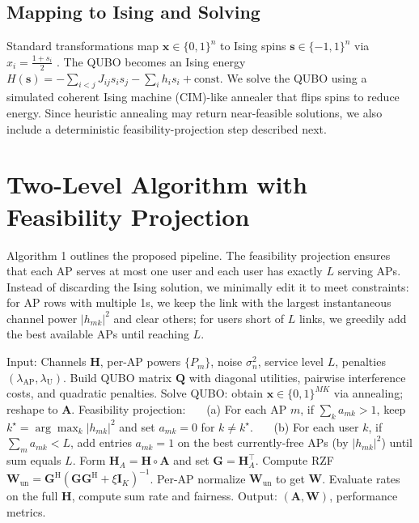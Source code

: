 \subsection{Mapping to Ising and Solving}
Standard transformations map $\mathbf{x}\in\{0,1\}^n$ to Ising spins $\mathbf{s}\in\{-1,1\}^n$ via $x_i=\frac{1+s_i}{2}$ \cite{lucas2014ising,glover2018tutorial}. The QUBO becomes an Ising energy $H(\mathbf{s})=-\sum_{i<j}J_{ij}s_is_j-\sum_i h_i s_i+\text{const}$. We solve the QUBO using a simulated coherent Ising machine (CIM)-like annealer that flips spins to reduce energy. Since heuristic annealing may return near-feasible solutions, we also include a deterministic feasibility-projection step described next.

\section{Two-Level Algorithm with Feasibility Projection}
Algorithm 1 outlines the proposed pipeline. The feasibility projection ensures that each AP serves at most one user and each user has exactly $L$ serving APs. Instead of discarding the Ising solution, we minimally edit it to meet constraints: for AP rows with multiple 1s, we keep the link with the largest instantaneous channel power $|h_{mk}|^2$ and clear others; for users short of $L$ links, we greedily add the best available APs until reaching $L$.

\begin{algorithm}[htbp]
\caption{Two-Level QUBO-RZF with Feasibility Projection}
\begin{algorithmic}[1]
\State Input: Channels $\mathbf{H}$, per-AP powers $\{P_m\}$, noise $\sigma_n^2$, service level $L$, penalties $(\lambda_{\text{AP}},\lambda_{\text{U}})$.
\State Build QUBO matrix $\mathbf{Q}$ with diagonal utilities, pairwise interference costs, and quadratic penalties.
\State Solve QUBO: obtain $\mathbf{x}\in\{0,1\}^{MK}$ via annealing; reshape to $\mathbf{A}$.
\State Feasibility projection:
\State ~~~(a) For each AP $m$, if $\sum_k a_{mk}>1$, keep $k^\star=\arg\max_k |h_{mk}|^2$ and set $a_{mk}=0$ for $k\neq k^\star$.
\State ~~~(b) For each user $k$, if $\sum_m a_{mk}<L$, add entries $a_{mk}=1$ on the best currently-free APs (by $|h_{mk}|^2$) until sum equals $L$.
\State Form $\mathbf{H}_A=\mathbf{H}\circ \mathbf{A}$ and set $\mathbf{G}=\mathbf{H}_A^\top$.
\State Compute RZF $\mathbf{W}_{\mathrm{un}}=\mathbf{G}^\mathrm{H}(\mathbf{G}\mathbf{G}^\mathrm{H}+\xi \mathbf{I}_K)^{-1}$.
\State Per-AP normalize $\mathbf{W}_{\mathrm{un}}$ to get $\mathbf{W}$.
\State Evaluate rates on the full $\mathbf{H}$, compute sum rate and fairness.
\State Output: $(\mathbf{A},\mathbf{W})$, performance metrics.
\end{algorithmic}
\end{algorithm}

